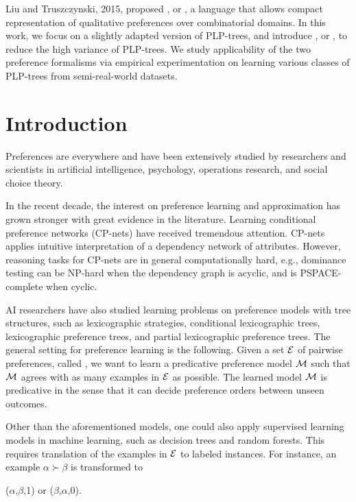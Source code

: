 Liu and Truszczynski, 2015, proposed , or , a language that allows compact representation
of qualitative preferences over combinatorial domains.
In this work, we focus on a slightly adapted version of PLP-trees,
and introduce ,
or , to reduce the high variance of PLP-trees.
We study applicability of the two preference formalisms 
via empirical experimentation on
learning various classes of PLP-trees from semi-real-world datasets.


\section{Introduction}
Preferences are everywhere and have been extensively studied
by researchers and scientists in artificial intelligence,
psychology, operations research, and social choice theory.

In the recent decade, the interest on preference learning
and approximation has grown stronger with great evidence
in the literature.
Learning conditional preference networks (CP-nets)\cite{boutilier2004cp}
have received tremendous attention.
CP-nets applies intuitive  interpretation
of a dependency network of attributes.
However, reasoning tasks for CP-nets are in general
computationally hard, e.g., dominance testing
can be NP-hard when the dependency graph is acyclic\cite{boutilier2004cp},
and is PSPACE-complete when cyclic\cite{goldsmith2008computational}.

AI researchers have also studied learning problems
on preference models with tree structures,
such as lexicographic strategies,
conditional lexicographic trees,
lexicographic preference trees, and
partial lexicographic preference trees.
The general setting for preference learning is the following.
Given a set $\mathcal{E}$ of pairwise preferences, called ,
we want to learn a predicative preference model $\mathcal{M}$ such that
$\mathcal{M}$ agrees with as many examples in $\mathcal{E}$ as possible.
The learned model $\mathcal{M}$ is predicative in the sense that
it can decide preference orders between unseen outcomes.

Other than the aforementioned models, 
one could also apply supervised learning models in
machine learning, such as decision trees and random
forests.
This requires translation of the examples in $\mathcal{E}$ to
labeled instances.
For instance, an example $\alpha \succ \beta$ is transformed
to
\begin{center}
	($\alpha$,$\beta$,1) or ($\beta$,$\alpha$,0).
\end{center}

